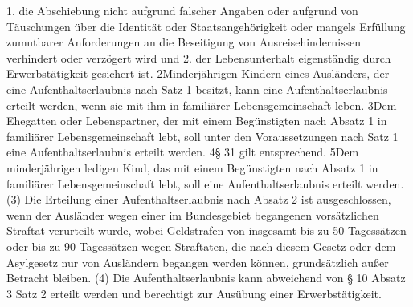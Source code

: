 1.	die Abschiebung nicht aufgrund falscher Angaben oder aufgrund von Täuschungen über die Identität oder Staatsangehörigkeit oder mangels Erfüllung zumutbarer Anforderungen an die Beseitigung von Ausreisehindernissen verhindert oder verzögert wird und
2.	der Lebensunterhalt eigenständig durch Erwerbstätigkeit gesichert ist.
2Minderjährigen Kindern eines Ausländers, der eine Aufenthaltserlaubnis nach Satz 1 besitzt, kann eine Aufenthaltserlaubnis erteilt werden, wenn sie mit ihm in familiärer Lebensgemeinschaft leben. 3Dem Ehegatten oder Lebenspartner, der mit einem Begünstigten nach Absatz 1 in familiärer Lebensgemeinschaft lebt, soll unter den Voraussetzungen nach Satz 1 eine Aufenthaltserlaubnis erteilt werden. 4§ 31 gilt entsprechend. 5Dem minderjährigen ledigen Kind, das mit einem Begünstigten nach Absatz 1 in familiärer Lebensgemeinschaft lebt, soll eine Aufenthaltserlaubnis erteilt werden.
(3) Die Erteilung einer Aufenthaltserlaubnis nach Absatz 2 ist ausgeschlossen, wenn der Ausländer wegen einer im Bundesgebiet begangenen vorsätzlichen Straftat verurteilt wurde, wobei Geldstrafen von insgesamt bis zu 50 Tagessätzen oder bis zu 90 Tagessätzen wegen Straftaten, die nach diesem Gesetz oder dem Asylgesetz nur von Ausländern begangen werden können, grundsätzlich außer Betracht bleiben.
(4) Die Aufenthaltserlaubnis kann abweichend von § 10 Absatz 3 Satz 2 erteilt werden und berechtigt zur Ausübung einer Erwerbstätigkeit.